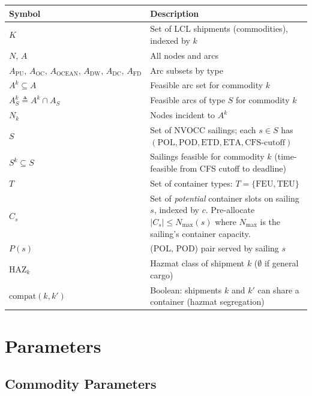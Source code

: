\documentclass[11pt,a4paper]{article}
\newcommand{\defeq}{\triangleq}
\theoremstyle{definition}
\begin{document}
\begin{center}
\begin{tabular}{lp{11.5cm}}
\toprule
Symbol & Description \\
\midrule
$K$ & Set of LCL shipments (commodities), indexed by $k$ \\
$N,\, A$ & All nodes and arcs \\
$A_{\text{PU}},\, A_{\text{OC}},\, A_{\text{OCEAN}},\, A_{\text{DW}},\, A_{\text{DC}},\, A_{\text{FD}}$ & Arc subsets by type \\
$A^k \subseteq A$ & Feasible arc set for commodity $k$ \\
$A^k_S \defeq A^k \cap A_S$ & Feasible arcs of type $S$ for commodity $k$ \\
$N_k$ & Nodes incident to $A^k$ \\
$S$ & Set of NVOCC sailings; each $s \in S$ has $(\text{POL}, \text{POD}, \text{ETD}, \text{ETA}, \text{CFS-cutoff})$ \\
$S^k \subseteq S$ & Sailings feasible for commodity $k$ (time-feasible from CFS cutoff to deadline) \\
$T$ & Set of container types: $T = \{\text{FEU}, \text{TEU}\}$ \\
$C_s$ & Set of \emph{potential} container slots on sailing $s$, indexed by $c$. Pre-allocate $|C_s| \leq N_{\max}(s)$ where $N_{\max}$ is the sailing's container capacity. \\
$P(s)$ & (POL, POD) pair served by sailing $s$ \\
$\text{HAZ}_k$ & Hazmat class of shipment $k$ ($\emptyset$ if general cargo) \\
$\text{compat}(k, k')$ & Boolean: shipments $k$ and $k'$ can share a container (hazmat segregation) \\
\bottomrule
\end{tabular}
\end{center}

\section{Parameters}

\subsection{Commodity Parameters}
\end{document}
